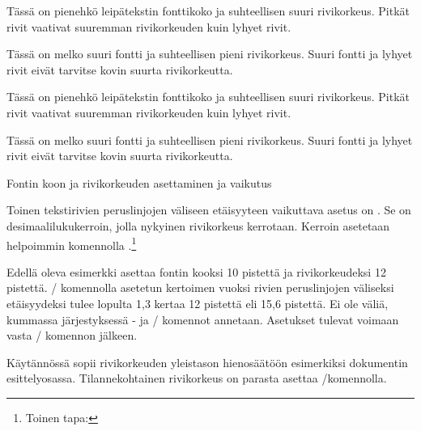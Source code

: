 \begin{esimerkki*}

\begin{koodilohko}
\fontsize{8bp}{11bp}\selectfont Tässä on pienehkö leipätekstin
fonttikoko ja suhteellisen suuri rivikorkeus. Pitkät rivit vaativat
suuremman rivikorkeuden kuin lyhyet rivit.

\fontsize{16bp}{17bp}\selectfont Tässä on melko suuri fontti ja
suhteellisen pieni rivikorkeus. Suuri fontti ja lyhyet rivit eivät
tarvitse kovin suurta rivikorkeutta.
\end{koodilohko}
  \begin{tulos}
    \fontsize{8bp}{11bp}\selectfont Tässä on pienehkö leipätekstin
    fonttikoko ja suhteellisen suuri rivikorkeus. Pitkät rivit vaativat
    suuremman rivikorkeuden kuin lyhyet rivit.

    \fontsize{16bp}{17bp}\selectfont Tässä on melko suuri fontti ja
    suhteellisen pieni rivikorkeus. Suuri fontti ja lyhyet rivit eivät
    tarvitse kovin suurta rivikorkeutta.
  \end{tulos}
  \caption{Fontin koon ja rivikorkeuden asettaminen ja vaikutus}
  \label{esim:rivikorkeus}
\end{esimerkki*}

Toinen tekstirivien peruslinjojen väliseen etäisyyteen vaikuttava asetus
on . Se on desimaalilukukerroin, jolla nykyinen
rivikorkeus kerrotaan. Kerroin asetetaan helpoimmin komennolla
.\footnote{Toinen tapa: }

\begin{koodilohkosis}
\fontsize{10bp}{12bp} \linespread{1.3} \selectfont
\end{koodilohkosis}

Edellä oleva esimerkki asettaa fontin kooksi 10 pistettä ja
rivikorkeudeksi 12 pistettä. \-/ komennolla asetetun
kertoimen vuoksi rivien peruslinjojen väliseksi etäisyydeksi tulee
lopulta 1,3 kertaa 12 pistettä eli 15,6 pistettä. Ei ole väliä, kummassa
järjestyksessä - ja \-/ komennot
annetaan. Asetukset tulevat voimaan vasta \-/
komennon jälkeen.

Käytännössä  sopii rivikorkeuden yleistason
hienosäätöön esimerkiksi dokumentin esittelyosassa. Tilannekohtainen
rivikorkeus on parasta asettaa \-/komennolla.

